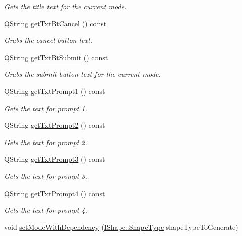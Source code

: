 \begin{DoxyCompactItemize}
\begin{DoxyCompactList}\small\item\em Gets the title text for the current mode. \end{DoxyCompactList}\item 
Q\+String \mbox{\hyperlink{class_v_m_editor_rect_frame_aef01144aec98320cbd4699140bc19d41}{get\+Txt\+Bt\+Cancel}} () const
\begin{DoxyCompactList}\small\item\em Grabs the cancel button text. \end{DoxyCompactList}\item 
Q\+String \mbox{\hyperlink{class_v_m_editor_rect_frame_af0fbf30acf7e87c5ab5511d51d6b0714}{get\+Txt\+Bt\+Submit}} () const
\begin{DoxyCompactList}\small\item\em Grabs the submit button text for the current mode. \end{DoxyCompactList}\item 
Q\+String \mbox{\hyperlink{class_v_m_editor_rect_frame_a0eb52752938820c82bcebf8b372164bf}{get\+Txt\+Prompt1}} () const
\begin{DoxyCompactList}\small\item\em Gets the text for prompt 1. \end{DoxyCompactList}\item 
Q\+String \mbox{\hyperlink{class_v_m_editor_rect_frame_add4d767616edfde7a5133aafc44dbd8e}{get\+Txt\+Prompt2}} () const
\begin{DoxyCompactList}\small\item\em Gets the text for prompt 2. \end{DoxyCompactList}\item 
Q\+String \mbox{\hyperlink{class_v_m_editor_rect_frame_ac547d797a8f4309bc1f0ab97bfdc262f}{get\+Txt\+Prompt3}} () const
\begin{DoxyCompactList}\small\item\em Gets the text for prompt 3. \end{DoxyCompactList}\item 
Q\+String \mbox{\hyperlink{class_v_m_editor_rect_frame_a6ae15857de45e5c9f239be713e744a2b}{get\+Txt\+Prompt4}} () const
\begin{DoxyCompactList}\small\item\em Gets the text for prompt 4. \end{DoxyCompactList}\item 
void \mbox{\hyperlink{class_v_m_editor_rect_frame_ac7282ca7fde9018068e261e40e1cf47d}{set\+Mode\+With\+Dependency}} (\mbox{\hyperlink{class_i_shape_a8f50993477b5ddb44c0547ef3d547cdc}{I\+Shape\+::\+Shape\+Type}} shape\+Type\+To\+Generate)

\end{DoxyCompactItemize}
